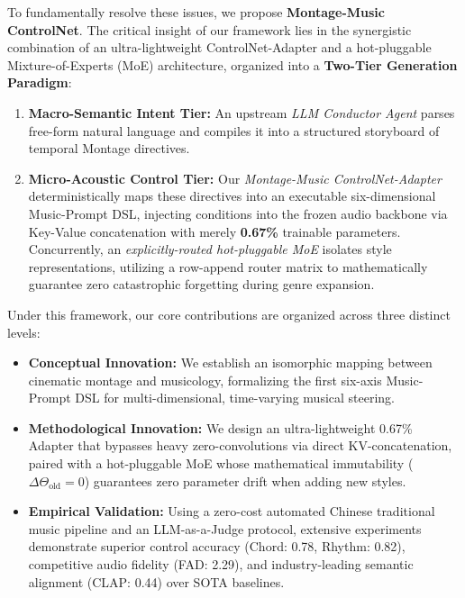 \documentclass[conference]{IEEEtran}
\begin{document}
To fundamentally resolve these issues, we propose \textbf{Montage-Music ControlNet}. The critical insight of our framework lies in the synergistic combination of an ultra-lightweight ControlNet-Adapter and a hot-pluggable Mixture-of-Experts (MoE) architecture, organized into a \textbf{Two-Tier Generation Paradigm}:
\begin{enumerate}[leftmargin=*,label=\textbf{Tier-\arabic*:}]
    \item \textbf{Macro-Semantic Intent Tier:} An upstream \textit{LLM Conductor Agent} parses free-form natural language and compiles it into a structured storyboard of temporal Montage directives.
    \item \textbf{Micro-Acoustic Control Tier:} Our \textit{Montage-Music ControlNet-Adapter} deterministically maps these directives into an executable six-dimensional Music-Prompt DSL, injecting conditions into the frozen audio backbone via Key-Value concatenation with merely \textbf{0.67\%} trainable parameters. Concurrently, an \textit{explicitly-routed hot-pluggable MoE} isolates style representations, utilizing a row-append router matrix to mathematically guarantee zero catastrophic forgetting during genre expansion.
\end{enumerate}

Under this framework, our core contributions are organized across three distinct levels:
\begin{itemize}[leftmargin=*]
    \item \textbf{Conceptual Innovation:} We establish an isomorphic mapping between cinematic montage and musicology, formalizing the first six-axis Music-Prompt DSL for multi-dimensional, time-varying musical steering.
    \item \textbf{Methodological Innovation:} We design an ultra-lightweight 0.67\% Adapter that bypasses heavy zero-convolutions via direct KV-concatenation, paired with a hot-pluggable MoE whose mathematical immutability ($\Delta \Theta_{\text{old}} = 0$) guarantees zero parameter drift when adding new styles.
    \item \textbf{Empirical Validation:} Using a zero-cost automated Chinese traditional music pipeline and an LLM-as-a-Judge protocol, extensive experiments demonstrate superior control accuracy (Chord: 0.78, Rhythm: 0.82), competitive audio fidelity (FAD: 2.29), and industry-leading semantic alignment (CLAP: 0.44) over SOTA baselines.
\end{itemize}

\end{document}
